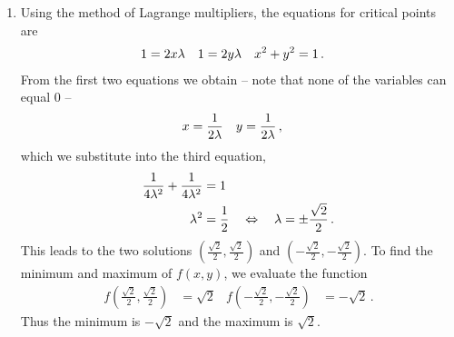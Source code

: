 \begin{solution}
\begin{enumerate}
\item
Using the method of Lagrange multipliers, the equations for critical points are
\begin{align*}
1 &= 2x\lambda &
1 &= 2y\lambda &
x^2 + y^2 &= 1\,.
\end{align*}
From the first two equations we obtain -- note that none of the variables can equal $0$ --
\begin{align*}
x &= \frac 1{2\lambda} &
y &= \frac{1}{2\lambda}\,,
\end{align*}
which we substitute into the third equation,
\begin{align*}
\frac{1}{4\lambda^2} + \frac{1}{4\lambda^2} & = 1\\
\lambda^2 &= \frac 12 \quad\Leftrightarrow\quad
\lambda = \pm \frac{\sqrt{2}}2\,.
\end{align*}
This leads to the two solutions $\left(\frac{\sqrt{2}}2, \frac{\sqrt{2}}2\right)$ and
$\left(-\frac{\sqrt{2}}2, -\frac{\sqrt{2}}2\right)$. To find the minimum and maximum of $f(x,y)$, we evaluate the function
\begin{align*}
f\left(\frac{\sqrt{2}}2, \frac{\sqrt{2}}2\right) &= \sqrt 2 &
f\left(-\frac{\sqrt{2}}2, -\frac{\sqrt{2}}2\right) &= -\sqrt 2\,.
\end{align*}
Thus the minimum is $-\sqrt{2}$ and the maximum is $\sqrt{2}$.


\end{enumerate}
\end{solution}
